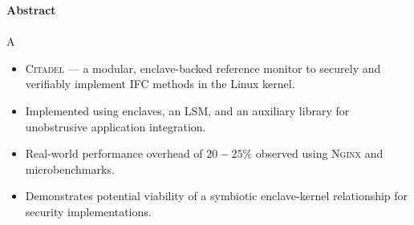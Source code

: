 \newpage
{\Huge \bf Abstract}
\vspace{24pt} 


\paragraph{} A

\begin{itemize}
    \item \textsc{Citadel} ---  a modular, enclave-backed reference monitor to securely and verifiably implement IFC methods in the Linux kernel.
    \item Implemented using enclaves, an LSM, and an auxiliary library for unobstrusive application integration.
    \item Real-world performance overhead of $20-25\%$ observed using \textsc{Nginx} and microbenchmarks.
    \item Demonstrates potential viability of a symbiotic enclave-kernel relationship for security implementations.
\end{itemize}


\newpage
\vspace*{\fill}
